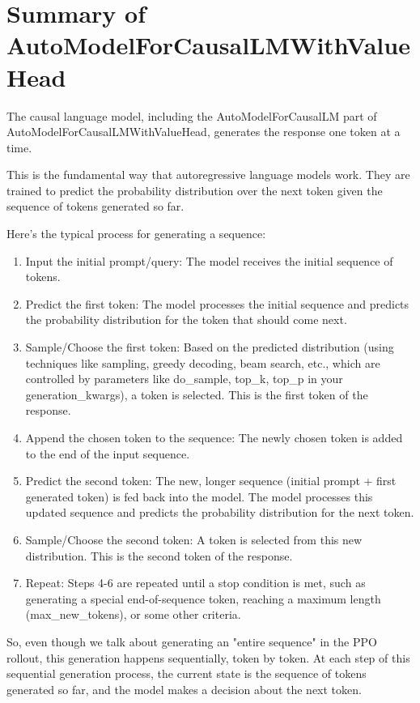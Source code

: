 \documentclass[10pt,a4paper]{report}
\begin{document}
\section{Summary of AutoModelForCausalLMWithValueHead}
The causal language model, including the AutoModelForCausalLM part of AutoModelForCausalLMWithValueHead, generates the response one token at a time.

This is the fundamental way that autoregressive language models work. They are trained to predict the probability distribution over the next token given the sequence of tokens generated so far.

Here's the typical process for generating a sequence:
\begin{enumerate}
\item    Input the initial prompt/query: The model receives the initial sequence of tokens.
\item    Predict the first token: The model processes the initial sequence and predicts the probability distribution for the token that should come next.
\item    Sample/Choose the first token: Based on the predicted distribution (using techniques like sampling, greedy decoding, beam search, etc., which are controlled by parameters like do\_sample, top\_k, top\_p in your generation\_kwargs), a token is selected. This is the first token of the response.
\item    Append the chosen token to the sequence: The newly chosen token is added to the end of the input sequence.
\item    Predict the second token: The new, longer sequence (initial prompt + first generated token) is fed back into the model. The model processes this updated sequence and predicts the probability distribution for the next token.
\item    Sample/Choose the second token: A token is selected from this new distribution. This is the second token of the response.
\item    Repeat: Steps 4-6 are repeated until a stop condition is met, such as generating a special end-of-sequence token, reaching a maximum length (max\_new\_tokens), or some other criteria.
\end{enumerate}

So, even though we talk about generating an "entire sequence" in the PPO rollout, this generation happens sequentially, token by token. At each step of this sequential generation process, the current state is the sequence of tokens generated so far, and the model makes a decision about the next token.
\end{document}
